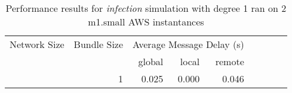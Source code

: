 \begin{table}
	  \caption[Performance results, \emph{infection:1 on 2 m1.small instances }]{ Performance results for \emph{ infection } simulation with degree 1 ran on 2 m1.small AWS instantances }
	\begin{tabular}{rrrrrrrrr}
	\hline\noalign{\smallskip}

	Network Size &
	Bundle Size &
	\multicolumn{3}{c}{Average Message Delay (s)}  \\

	 & 
     & global & local & remote\\

			
				\noalign{\smallskip}\hline
				\multirow{ 1 }{*}{ 10000 } &
				
					
					 
					\multirow{ 1 }{*}{ 1 } &
					
						
							    
							    
	                           0.025 & 0.000 & 0.046  \\
	                
	            
	        

\hline

\end{tabular}
\end{table}
\clearpage


	    

